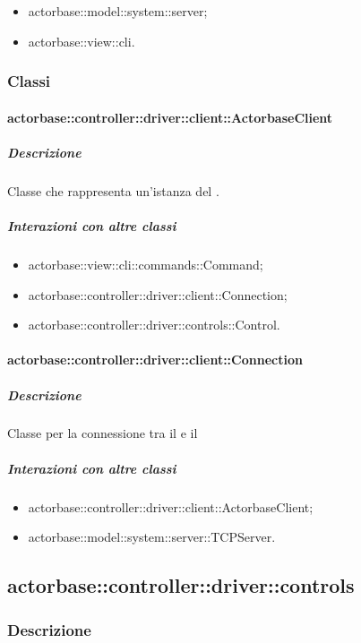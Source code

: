 \documentclass{scalatekids-article}
\begin{document}
\begin{itemize}
\item actorbase::model::system::server;
\item actorbase::view::cli.%
\end{itemize}

\subsubsection{Classi}

\paragraph{actorbase::controller::driver::client::ActorbaseClient}

\subparagraph{Descrizione}

Classe che rappresenta un'istanza del .

\subparagraph{Interazioni con altre classi}

\begin{itemize}
\item actorbase::view::cli::commands::Command;
\item actorbase::controller::driver::client::Connection;
\item actorbase::controller::driver::controls::Control.
\end{itemize}

\paragraph{actorbase::controller::driver::client::Connection}

\subparagraph{Descrizione}

Classe per la connessione tra il  e il 

\subparagraph{Interazioni con altre classi}
\begin{itemize}
\item actorbase::controller::driver::client::ActorbaseClient;
\item actorbase::model::system::server::TCPServer.
\end{itemize}

\subsection{actorbase::controller::driver::controls}

\subsubsection{Descrizione}
\end{document}
